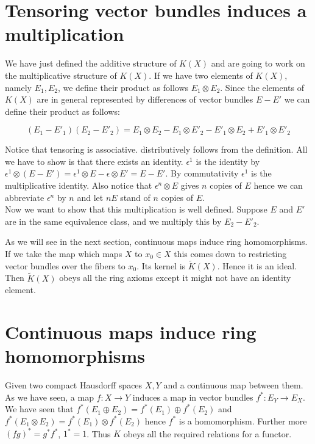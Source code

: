 \documentclass[../Thesis.tex]{subfiles}
\begin{document}
\section{Tensoring vector bundles induces a multiplication}
We have just defined the additive structure of $K(X)$ and are going to work on the multiplicative structure of $K(X)$. If we have two elements of $K(X)$, namely $E_1, E_2$, we define their product as follows $E_1 \otimes E_2$. Since the elements of $K(X)$ are in general represented by differences of vector bundles $E - E'$ we can define their product as follows:

\begin{equation} 
(E_1 - E'_1)(E_2 - E'_2) = E_1 \otimes E_2 - E_1 \otimes E'_2 - E'_1 \otimes E_2 + E'_1 \otimes E'_2
\end{equation}

Notice that tensoring is associative. distributively follows from the definition. All we have to show is that there exists an identity. $\epsilon^1$ is the identity by $\epsilon^1 \otimes ( E - E') = \epsilon^1 \otimes E - \epsilon \otimes E'= E - E'$. By commutativity $\epsilon^1$ is the multiplicative identity. Also notice that $\epsilon^n \otimes E$ gives $n$ copies of $E$ hence we can abbreviate $\epsilon^n$ by $n$ and let $nE$ stand of $n$ copies of $E$.
\\Now we want to show that this multiplication is well defined. Suppose $E$ and $E'$ are in the same equivalence class, and we multiply this by $E_2 - E'_2$. 







As we will see in the next section, continuous maps induce ring homomorphisms. If we take the map which maps $X$ to $x_0 \in X$ this comes down to restricting vector bundles over the fibers to $x_0$. Its kernel is $\tilde{K}(X)$. Hence it is an ideal. Then $\tilde{K}(X)$ obeys all the ring axioms except it might not have an identity element.
\section{Continuous maps induce ring homomorphisms}
Given two compact Hausdorff spaces $X, Y$ and a continuous map between them. As we have seen, a map $f: X \rightarrow Y$ induces a map in vector bundles $f^*: E_Y \rightarrow E_X$. We have seen that $f^* (E_1 \oplus E_2) = f^*(E_1) \oplus f^*(E_2)$ and $f^*(E_1 \otimes E_2) = f^*(E_1) \otimes f^*(E_2)$ hence $f^*$ is a homomorphism. Further more $(fg)^* = g^* f^*$, $1^* = 1$. Thus $K$ obeys all the required relations for a functor. 
\end{document}
